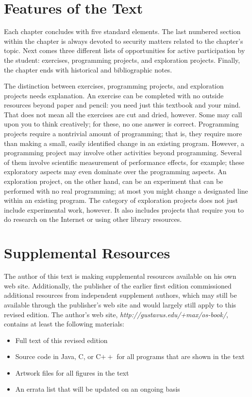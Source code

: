 \section*{Features of the Text}

Each chapter concludes with five standard elements.  The last numbered
section within the chapter is always devoted to security matters
related to the chapter's topic.  Next comes three different lists of
opportunities for active participation by the student: exercises,
programming projects, and exploration projects.  Finally, the chapter
ends with historical and bibliographic notes.

The distinction between exercises, programming projects, and
exploration projects needs explanation.  An exercise can be completed
with no outside resources beyond paper and pencil: you need just this
textbook and your mind.  That does not mean all the exercises are cut
and dried, however.  Some may call upon you to think creatively; for
these, no one answer is correct.  Programming projects require a
nontrivial amount of programming; that is, they require more than
making a small, easily identified change in an existing
program. However, a programming project may involve other activities
beyond programming.  Several of them involve scientific measurement of
performance effects, for example; these exploratory aspects may even
dominate over the programming aspects.  An exploration project, on the
other hand, can be an experiment that can be performed with no real
programming; at most you might change a designated line within an
existing program.  The category of exploration projects does not just
include experimental work, however.  It also includes projects that
require you to do research on the Internet or using other library
resources.

\section*{Supplemental Resources}

The author of this text is making supplemental resources available on
his own web site.  Additionally, the publisher of the
earlier first edition commissioned
additional resources from independent supplement authors,
which may still be available through the publisher's web site
and would largely still apply to this revised edition.
The author's web site, \textit{http://gustavus.edu/+max/os-book/},
contains at least the following materials:
\begin{itemize}
\item
Full text of this revised edition
\item
Source code in Java, C, or C$++$ for all programs
that are shown in the text
\item
Artwork files for all figures in the text
\item
An errata list that will be updated on an ongoing basis
\end{itemize}

